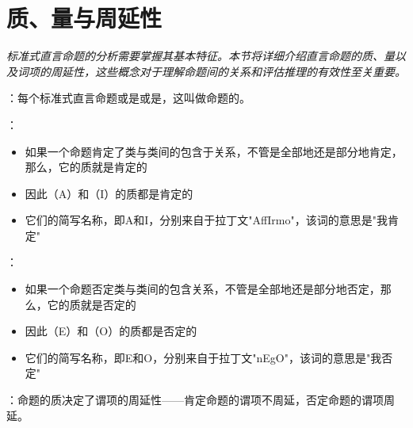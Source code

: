\section{质、量与周延性}

\begin{logicbox}[title=引言]
\textit{标准式直言命题的分析需要掌握其基本特征。本节将详细介绍直言命题的质、量以及词项的周延性，这些概念对于理解命题间的关系和评估推理的有效性至关重要。}
\end{logicbox}

\begin{theorembox}[title=直言命题的质]
：每个标准式直言命题或是或是，这叫做命题的。

：
\begin{itemize}
  \item 如果一个命题肯定了类与类间的包含于关系，不管是全部地还是部分地肯定，那么，它的质就是肯定的
  \item 因此（A）和（I）的质都是肯定的
  \item 它们的简写名称，即A和I，分别来自于拉丁文"AffIrmo"，该词的意思是"我肯定"
\end{itemize}

：
\begin{itemize}
  \item 如果一个命题否定类与类间的包含关系，不管是全部地还是部分地否定，那么，它的质就是否定的
  \item 因此（E）和（O）的质都是否定的
  \item 它们的简写名称，即E和O，分别来自于拉丁文"nEgO"，该词的意思是"我否定"
\end{itemize}

：命题的质决定了谓项的周延性——肯定命题的谓项不周延，否定命题的谓项周延。
\end{theorembox}

